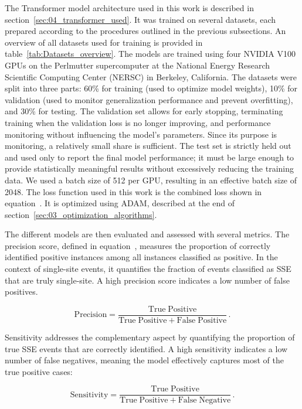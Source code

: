 The Transformer model architecture used in this work is described in section~\ref{sec:04_transformer_used}. It was trained on several datasets, each prepared according to the procedures outlined in the previous subsections. An overview of all datasets used for training is provided in table~\ref{tab:Datasets_overview}. 
The models are trained using four NVIDIA V100 GPUs on the Perlmutter supercomputer at the National Energy Research Scientific Computing Center (NERSC) in Berkeley, California. 
The datasets were split into three parts: 60\% for training (used to optimize model weights), 10\% for validation (used to monitor generalization performance and prevent overfitting), and 30\% for testing. The validation set allows for early stopping, terminating training when the validation loss is no longer improving, and performance monitoring without influencing the model's parameters. 
Since its purpose is monitoring, a relatively small share is sufficient. The test set is strictly held out and used only to report the final model performance; it must be large enough to provide statistically meaningful results without excessively reducing the training data. 
We used a batch size of 512 per GPU, resulting in an effective batch size of 2048.
The loss function used in this work is the combined loss shown in equation~. It is optimized using ADAM, described at the end of section~\ref{sec:03_optimization_algorithms}.  

The different models are then evaluated and assessed with several metrics. 
The precision score, defined in equation~, measures the proportion of correctly identified positive instances among all instances classified as positive. In the context of single-site events, it quantifies the fraction of events classified as SSE that are truly single-site. A high precision score indicates a low number of false positives.

\begin{equation}
\label{eq:precision_score}
	\mathrm{Precision} = \frac{\mathrm{True \; Positive}}{\mathrm{True \; Positive + False \; Positive}} \,. 
\end{equation}

Sensitivity addresses the complementary aspect by quantifying the proportion of true SSE events that are correctly identified. A high sensitivity indicates a low number of false negatives, meaning the model effectively captures most of the true positive cases: 

\begin{equation}
\label{eq:sensitivity_score}
	\mathrm{Sensitivity} = \frac{\mathrm{True \; Positive}}{\mathrm{True \; Positive + False \; Negative}} \,.
\end{equation}

